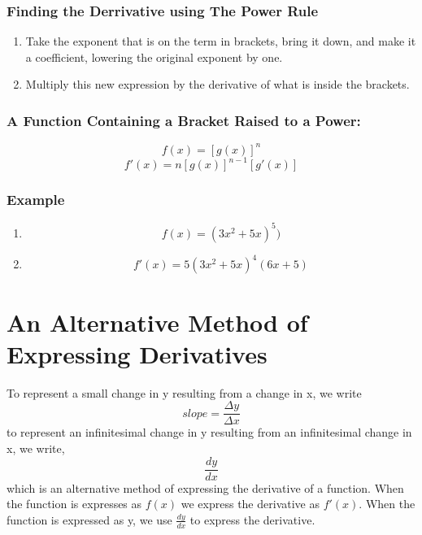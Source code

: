 \documentclass[a4paper,11pt]{book}
\begin{document}
\subsubsection{Finding the Derrivative using The Power Rule}
\begin{enumerate}
  \item Take the exponent that is on the term in brackets, bring it down, and make it a coefficient, lowering the original exponent by one.
  \item Multiply this new expression by the derivative of what is inside the brackets.
\end{enumerate}

\subsubsection{A Function Containing a Bracket Raised to a Power:}
\LARGE 
\[ f(x) = [g(x)]^n \]
\[ f'(x) = n[g(x)]^{n-1}[g'(x)] \]

\subsubsection{Example}
\LARGE 
\begin{enumerate}
  \item \[ f(x) = (3x^2 + 5x)^5) \]
  \item \[ f'(x) = 5(3x^2 + 5x)^4(6x + 5) \]
\end{enumerate}
\normalsize 










\section{An Alternative Method of Expressing Derivatives}
To represent a small change in y resulting from a change in x, we write
\LARGE
\[ slope= \frac{\Delta y}{\Delta x} \]
\normalsize 
to represent an infinitesimal change in y resulting from an infinitesimal change in x, we write,
\LARGE \[ \frac{dy}{dx} \]
\normalsize
which is an alternative method of expressing the derivative of a function. When the function is expresses as $ f(x) $ we express the derivative as $ f'(x) $. When the function is expressed as y, we use $ \frac{dy}{dx} $ to express the derivative.
\end{document}
